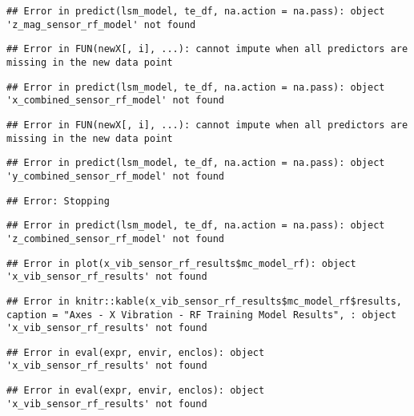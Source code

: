 \documentclass[]{article}
\begin{document}
\begin{verbatim}
## Error in predict(lsm_model, te_df, na.action = na.pass): object 'z_mag_sensor_rf_model' not found
\end{verbatim}

\begin{verbatim}
## Error in FUN(newX[, i], ...): cannot impute when all predictors are missing in the new data point
\end{verbatim}

\begin{verbatim}
## Error in predict(lsm_model, te_df, na.action = na.pass): object 'x_combined_sensor_rf_model' not found
\end{verbatim}

\begin{verbatim}
## Error in FUN(newX[, i], ...): cannot impute when all predictors are missing in the new data point
\end{verbatim}

\begin{verbatim}
## Error in predict(lsm_model, te_df, na.action = na.pass): object 'y_combined_sensor_rf_model' not found
\end{verbatim}

\begin{verbatim}
## Error: Stopping
\end{verbatim}

\begin{verbatim}
## Error in predict(lsm_model, te_df, na.action = na.pass): object 'z_combined_sensor_rf_model' not found
\end{verbatim}

\begin{verbatim}
## Error in plot(x_vib_sensor_rf_results$mc_model_rf): object 'x_vib_sensor_rf_results' not found
\end{verbatim}

\begin{verbatim}
## Error in knitr::kable(x_vib_sensor_rf_results$mc_model_rf$results, caption = "Axes - X Vibration - RF Training Model Results", : object 'x_vib_sensor_rf_results' not found
\end{verbatim}

\begin{verbatim}
## Error in eval(expr, envir, enclos): object 'x_vib_sensor_rf_results' not found
\end{verbatim}

\begin{verbatim}
## Error in eval(expr, envir, enclos): object 'x_vib_sensor_rf_results' not found
\end{verbatim}
\end{document}
